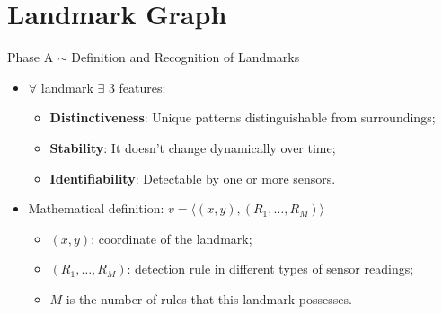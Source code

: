 \section[L. Graph]{Landmark Graph}
\begin{frame}{Phase A $\sim$ Definition and Recognition of Landmarks}
    \begin{itemize}
        \item $\forall$ landmark $\exists$ 3 features:
            \begin{itemize}
                \item \textbf{Distinctiveness}: Unique patterns distinguishable from surroundings;
                \item \textbf{Stability}: It doesn't change dynamically over time;
                \item \textbf{Identifiability}: Detectable by one or more sensors.
            \end{itemize}
        \item Mathematical definition: \( v = \langle (x, y), (R_1, \ldots, R_M) \rangle \)
            \begin{itemize}
                  \item $(x, y)$: coordinate of the landmark;
                  \item $(R_1, \dots ,R_M)$: detection rule in different types of sensor readings;
                  \item $M$ is the number of rules that this landmark possesses.
            \end{itemize}
    \end{itemize}
\end{frame}


